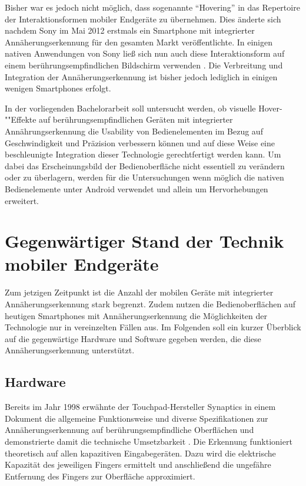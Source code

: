 \documentclass[12pt,numbers=noenddot,parskip,bibliography=totocnumbered,listof=totocnumbered]{scrreprt}
\begin{document}
Bisher war es jedoch nicht möglich, dass sogenannte "`Hovering"' in das Repertoire der Interaktionsformen mobiler Endgeräte zu übernehmen. Dies änderte sich nachdem Sony im Mai 2012 erstmals ein Smartphone mit integrierter Annäherungserkennung für den gesamten Markt veröffentlichte. In einigen nativen Anwendungen von Sony ließ sich nun auch diese Interaktionsform auf einem berührungsempfindlichen Bildschirm verwenden \citep{sonyverge}. Die Verbreitung und Integration der Annäherungserkennung ist bisher jedoch lediglich in einigen wenigen Smartphones erfolgt.

In der vorliegenden Bachelorarbeit soll untersucht werden, ob visuelle Hover-""Effekte auf berührungsempfindlichen Geräten mit integrierter Annährungserkennung die Usability von Bedienelementen im Bezug auf Geschwindigkeit und Präzision verbessern können und auf diese Weise eine beschleunigte Integration dieser Technologie gerechtfertigt werden kann. Um dabei das Erscheinungsbild der Bedienoberfläche nicht essentiell zu verändern oder zu überlagern, werden für die Untersuchungen wenn möglich die nativen Bedienelemente unter Android verwendet und allein um Hervorhebungen erweitert.

\section{Gegenwärtiger Stand der Technik mobiler Endgeräte}
Zum jetzigen Zeitpunkt ist die Anzahl der mobilen Geräte mit integrierter Annäherungserkennung stark begrenzt. Zudem nutzen die Bedienoberflächen auf heutigen Smartphones mit Annäherungserkennung die Möglichkeiten der Technologie nur in vereinzelten Fällen aus. Im Folgenden soll ein kurzer Überblick auf die gegenwärtige Hardware und Software gegeben werden, die diese Annäherungserkennung unterstützt.

\subsection{Hardware}
Bereits im Jahr 1998 erwähnte der Touchpad-Hersteller Synaptics in einem Dokument die allgemeine Funktionsweise und diverse Spezifikationen zur Annäherungserkennung auf berührungsempfindliche Oberflächen und demonstrierte damit die technische Umsetzbarkeit \citep{synaptics}. Die Erkennung funktioniert theoretisch auf allen kapazitiven Eingabegeräten. Dazu wird die elektrische Kapazität des jeweiligen Fingers ermittelt und anschließend die ungefähre Entfernung des Fingers zur Oberfläche approximiert.
\end{document}
